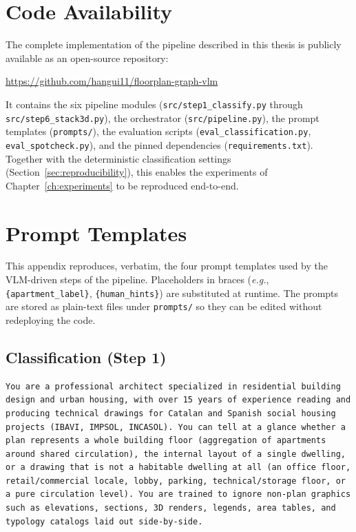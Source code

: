 \documentclass[12pt,a4paper,openright]{report}
\newcommand{\eg}{\textit{e.g.}}
\newcommand{\code}[1]{\texttt{#1}}
\begin{document}
\begin{appendices}

\chapter{Code Availability}
\label{appendix:code}

The complete implementation of the pipeline described in this thesis is publicly
available as an open-source repository:

\begin{center}
\url{https://github.com/hangui11/floorplan-graph-vlm}
\end{center}

\noindent It contains the six pipeline modules (\code{src/step1\_classify.py}
through \code{src/step6\_stack3d.py}), the orchestrator (\code{src/pipeline.py}),
the prompt templates (\code{prompts/}), the evaluation scripts
(\code{eval\_classification.py}, \code{eval\_spotcheck.py}), and the pinned
dependencies (\code{requirements.txt}). Together with the deterministic
classification settings (Section~\ref{sec:reproducibility}), this enables the
experiments of Chapter~\ref{ch:experiments} to be reproduced end-to-end.


\chapter{Prompt Templates}
\label{appendix:prompting}

This appendix reproduces, verbatim, the four prompt templates used by the
VLM-driven steps of the pipeline. Placeholders in braces (\eg,
\code{\{apartment\_label\}}, \code{\{human\_hints\}}) are substituted at
runtime. The prompts are stored as plain-text files under \code{prompts/} so
they can be edited without redeploying the code.

\section{Classification (Step 1)}
\label{appendix:prompt-classify}

\begin{lstlisting}[style=prompt]
You are a professional architect specialized in residential building design and urban housing, with over 15 years of experience reading and producing technical drawings for Catalan and Spanish social housing projects (IBAVI, IMPSOL, INCASOL). You can tell at a glance whether a plan represents a whole building floor (aggregation of apartments around shared circulation), the internal layout of a single dwelling, or a drawing that is not a habitable dwelling at all (an office floor, retail/commercial locale, lobby, parking, technical/storage floor, or a pure circulation level). You are trained to ignore non-plan graphics such as elevations, sections, 3D renders, legends, area tables, and typology catalogs laid out side-by-side.


\end{lstlisting}
\end{appendices}
\end{document}
